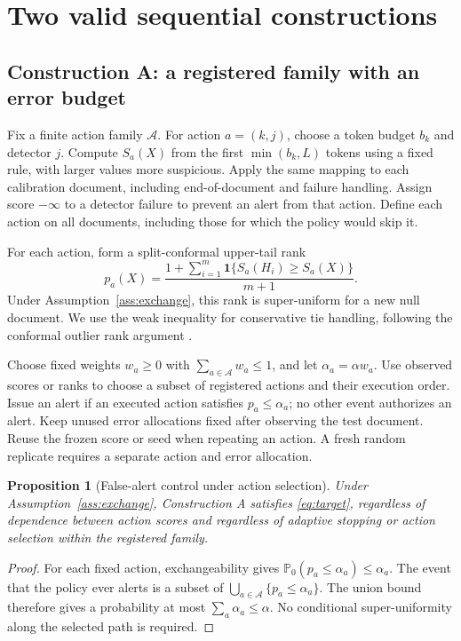 \documentclass[pdflatex,sn-mathphys-num]{sn-jnl}
\newtheorem{proposition}{Proposition}
\newcommand{\Prob}{\mathbb{P}}
\newcommand{\ind}{\mathbf{1}}
\newcommand{\calA}{\mathcal{A}}
\begin{document}
\section{Two valid sequential constructions}\label{sec:methods}

\subsection{Construction A: a registered family with an error budget}

Fix a finite action family \(\calA\). For action \(a=(k,j)\), choose a token budget \(b_k\) and detector \(j\). Compute \(S_a(X)\) from the first \(\min(b_k,L)\) tokens using a fixed rule, with larger values more suspicious. Apply the same mapping to each calibration document, including end-of-document and failure handling. Assign score \(-\infty\) to a detector failure to prevent an alert from that action. Define each action on all documents, including those for which the policy would skip it.

For each action, form a split-conformal upper-tail rank
\begin{equation}
 p_a(X)=\frac{1+\sum_{i=1}^{m}\ind\{S_a(H_i)\geq S_a(X)\}}{m+1}.
 \label{eq:rank}
\end{equation}
Under Assumption~\ref{ass:exchange}, this rank is super-uniform for a new null document. We use the weak inequality for conservative tie handling, following the conformal outlier rank argument \citep{bates2023}.

Choose fixed weights \(w_a\geq0\) with \(\sum_{a\in\calA}w_a\leq1\), and let \(\alpha_a=\alpha w_a\). Use observed scores or ranks to choose a subset of registered actions and their execution order. Issue an alert if an executed action satisfies \(p_a\leq\alpha_a\); no other event authorizes an alert. Keep unused error allocations fixed after observing the test document. Reuse the frozen score or seed when repeating an action. A fresh random replicate requires a separate action and error allocation.

\begin{proposition}[False-alert control under action selection]\label{prop:spending}
Under Assumption~\ref{ass:exchange}, Construction A satisfies \eqref{eq:target}, regardless of dependence between action scores and regardless of adaptive stopping or action selection within the registered family.
\end{proposition}
\begin{proof}
For each fixed action, exchangeability gives \(\Prob_0(p_a\leq\alpha_a)\leq\alpha_a\). The event that the policy ever alerts is a subset of \(\bigcup_{a\in\calA}\{p_a\leq\alpha_a\}\). The union bound therefore gives a probability at most \(\sum_a\alpha_a\leq\alpha\). No conditional super-uniformity along the selected path is required.
\end{proof}
\end{document}
